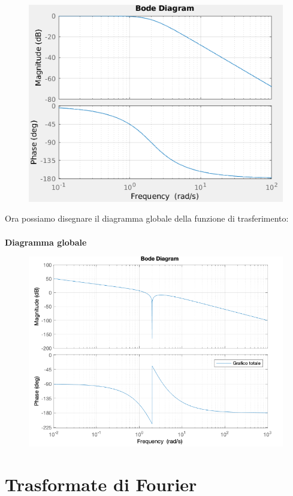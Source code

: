\documentclass[12pt,a4paper]{article}
\begin{document}
\begin{itemize}
		\newpage
		\begin{figure}[h!]
			\centering
			\includegraphics[scale=0.5]{./images/bode46_5.png}
		\end{figure}
	\end{itemize}
	Ora possiamo disegnare il diagramma globale della funzione di trasferimento:\\\\
	\textbf{Diagramma globale}
	\begin{figure}[h!]
		\centering
		\includegraphics[scale=0.6]{./images/bode46tot.png}
	\end{figure}
	\newpage
	\section{Trasformate di Fourier}
\end{document}
